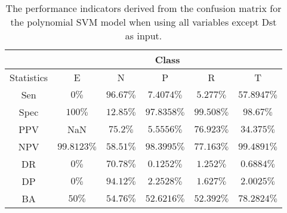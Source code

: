\begin{table}[!ht]
	\centering
	\begin{tabular}{|c|c|c|c|c|c|}
		\hline
		 & \multicolumn{5}{c|}{Class} \\ \hline
		Statistics & E & N & P & R & T \\ \hline
		Sen & $0\%$ & $96.67\%$ & $7.4074\%$ & $5.277\%$ & $57.8947\%$ \\ \hline
		Spec & $100\%$ & $12.85\%$ & $97.8358\%$ & $99.508\%$ & $98.67\%$ \\ \hline
		PPV & NaN & $75.2\%$ & $5.5556\%$ & $76.923\%$ & $34.375\%$ \\ \hline
		NPV & $99.8123\%$ & $58.51\%$ & $98.3995\%$ & $77.163\%$ & $99.4891\%$ \\ \hline
		DR & $0\%$ & $70.78\%$ & $0.1252\%$ & $1.252\%$ & $0.6884\%$ \\ \hline
		DP & $0\%$ & $94.12\%$ & $2.2528\%$ & $1.627\%$ & $2.0025\%$ \\ \hline
		BA & $50\%$ & $54.76\%$ & $52.6216\%$ & $52.392\%$ & $78.2824\%$ \\ \hline
	\end{tabular}
	\caption{The performance indicators derived from the confusion matrix for the polynomial SVM model when using all variables except Dst as input.}
	\label{tab:cs:reverse:noDst:svmPoly}
\end{table}
